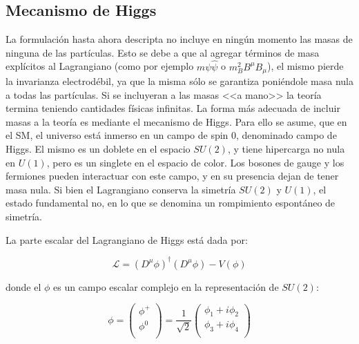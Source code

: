 \subsection{Mecanismo de Higgs}

La formulación hasta ahora descripta no incluye en ningún momento las masas de ninguna de las partículas. Esto se debe a que al agregar términos de masa explícitos al Lagrangiano (como por ejemplo $m\psi\hat{\psi}$ o $m_B^2 B^{\mu}B_{\mu}$), el mismo pierde la invarianza electrodébil, ya que la misma sólo se garantiza poniéndole masa nula a todas las partículas. Si se incluyeran a las masas <<a mano>> la teoría termina teniendo cantidades físicas infinitas. 
La forma más adecuada de incluir masas a la teoría
es mediante el mecanismo de Higgs. Para ello se asume, que en el SM, el universo está inmerso en un campo de spin 0, denominado campo de Higgs. El mismo es un doblete en el espacio $SU(2)$, y tiene hipercarga no nula en $U(1)$, pero es un singlete en el espacio de color. 
Los bosones de gauge y los fermiones pueden interactuar con este campo, y en su presencia dejan de tener masa nula. Si bien el Lagrangiano conserva la simetría $SU(2)$ y $U(1)$, el estado fundamental no, en lo que se denomina un rompimiento espontáneo de simetría.

La parte escalar del Lagrangiano de Higgs está dada por:

\begin{equation}
\mathcal{L} = (D^{\mu}\phi)^{\dagger}(D^{\mu}\phi) - V(\phi)
\end{equation}

\noindent
donde el $\phi$ es un campo escalar complejo en la representación de $SU(2)$:

\begin{equation}
	\phi = 
	\begin{pmatrix}
	\phi^{+} \\
	\phi^{0} \\
	\end{pmatrix} = \frac{1}{\sqrt{2}}
	\begin{pmatrix}
	\phi_{1} + i\phi_{2} \\
	\phi_{3} + i\phi_{4} \\
	\end{pmatrix}
\end{equation}

